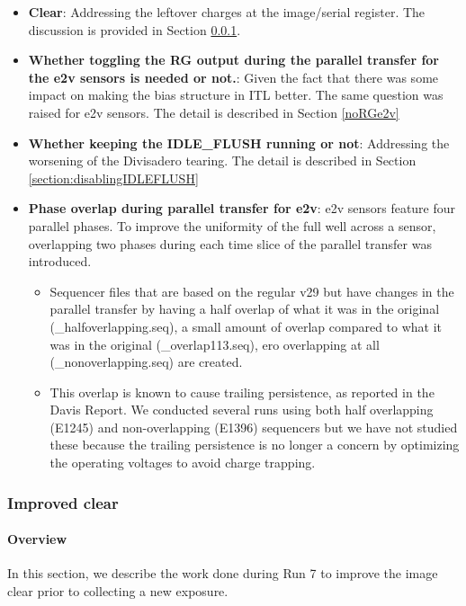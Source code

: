 \begin{itemize}
\item {\bf Clear}: Addressing the leftover charges at the image/serial register. The discussion is provided in Section \ref{sec:improved-clear}.
\item {\bf Whether toggling the RG output during the parallel transfer for the e2v sensors is needed or not.}: Given the fact that there was some impact on making the bias structure in ITL better. The same question was raised for e2v sensors. The detail is described in Section \ref{noRGe2v}
\item {\bf Whether keeping the IDLE\_FLUSH running or not}: Addressing the worsening of the Divisadero tearing. The detail is described in Section \ref{section:disablingIDLEFLUSH}
\item {\bf Phase overlap during parallel transfer for e2v}: e2v sensors feature four parallel phases. To improve the uniformity of the full well across a sensor, overlapping two phases during each time slice of the parallel transfer was introduced.
\begin{itemize}
    \item Sequencer files that are based on the regular v29 but have changes in the parallel transfer by having a half overlap of what it was in the original (\_halfoverlapping.seq), a small amount of overlap compared to what it was in the original (\_overlap113.seq), ero overlapping at all (\_nonoverlapping.seq) are created.
    \item This overlap is known to cause trailing persistence, as reported in the Davis Report. We conducted several runs using both half overlapping (E1245) and non-overlapping (E1396) sequencers but we have not studied these because the trailing persistence is no longer a concern by optimizing the operating voltages to avoid charge trapping. 
\end{itemize}


\end{itemize}

\subsubsection{Improved clear}\label{sec:improved-clear}

\paragraph{Overview}\label{overview}

In this section, we describe the work done during Run 7 to improve
the image clear prior to collecting a new exposure.


